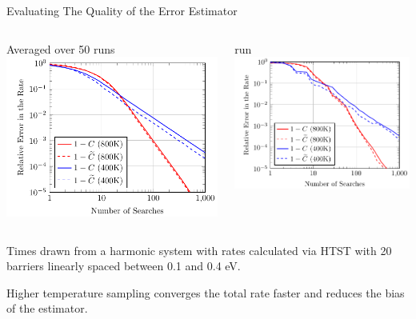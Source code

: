 \documentclass[onlymath]{beamer}
\begin{document}
\begin{frame}{Evaluating The Quality of the Error Estimator}

\begin{columns}
\begin{column}{0.5\textwidth}
\centering Averaged over 50 runs
\includegraphics[width=\columnwidth]{images/confidence-test.pdf}
\end{column}
\begin{column}{0.5\textwidth}
 run
\includegraphics[width=\columnwidth]{images/confidence-test-noavg.pdf}
\end{column}
\end{columns}

Times drawn from a harmonic system with rates calculated via HTST with 20 barriers linearly spaced between 0.1 and 0.4 eV.

Higher temperature sampling converges the total rate faster and reduces the bias of the estimator.

\end{frame}
\end{document}
